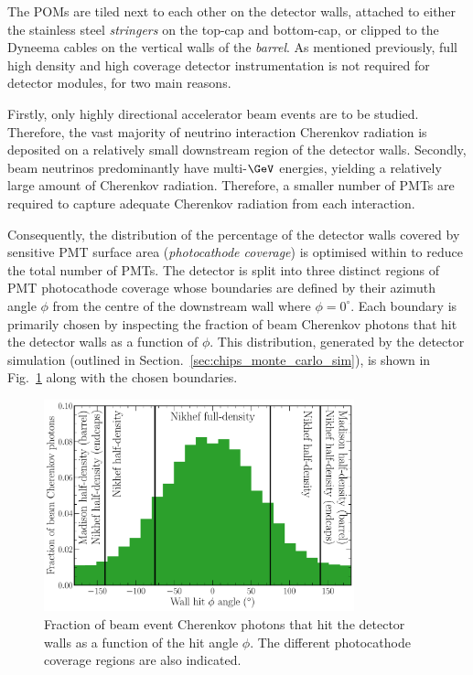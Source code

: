 The POMs are tiled next to each other on the detector walls, attached to either the stainless
steel \emph{stringers} on the top-cap and bottom-cap, or clipped to the Dyneema cables on the
vertical walls of the \emph{barrel}. As mentioned previously, full high density and high coverage
detector instrumentation is not required for \chips detector modules, for two main reasons.

Firstly, only highly directional accelerator beam events are to be studied. Therefore, the vast
majority of neutrino interaction Cherenkov radiation is deposited on a relatively small downstream
region of the detector walls. Secondly, beam neutrinos predominantly have multi-$\GeV$ energies,
yielding a relatively large amount of Cherenkov radiation. Therefore, a smaller number of PMTs are
required to capture adequate Cherenkov radiation from each interaction.

Consequently, the distribution of the percentage of the detector walls covered by sensitive PMT
surface area (\emph{photocathode coverage}) is optimised within \chipsfive to reduce the total
number of PMTs. The detector is split into three distinct regions of PMT photocathode coverage
whose boundaries are defined by their azimuth angle $\phi$ from the centre of the downstream wall
where $\phi=0^{\circ}$. Each boundary is primarily chosen by inspecting the fraction of beam
Cherenkov photons that hit the detector walls as a function of $\phi$. This distribution,
generated by the detector simulation (outlined in Section.~\ref{sec:chips_monte_carlo_sim}), is
shown in Fig.~\ref{fig:coverage} along with the chosen boundaries.

\begin{figure} %
    \includegraphics[width=0.8\textwidth]{diagrams/4-chips/coverage.pdf}
    \caption[Fraction of beam event Cherenkov photons that hit the detector walls as a function of
        the hit angle] {Fraction of beam event Cherenkov photons that hit the detector walls as a
        function of the hit angle $\phi$. The different photocathode coverage regions are also
        indicated.}
    \label{fig:coverage}
\end{figure}

